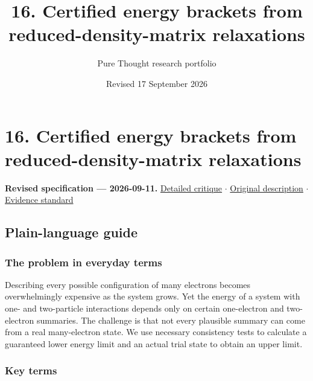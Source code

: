 \documentclass[
  11pt,
]{article}
\title{16. Certified energy brackets from reduced-density-matrix
relaxations}
\author{Pure Thought research portfolio}
\date{Revised 17 September 2026}
\begin{document}
\maketitle
\thispagestyle{empty}
\clearpage

\section{16. Certified energy brackets from reduced-density-matrix
relaxations}

\textbf{Revised specification --- 2026-09-11.}
\href{https://github.com/rick-stevens-ai/Pure-Thought/blob/main/reviews/16-N-Representability-2RDM.md}{Detailed
critique} \ensuremath{\cdot}
\href{https://github.com/rick-stevens-ai/Pure-Thought/blob/main/archive/original-PRDs/16-N-Representability-2RDM.md}{Original
description} \ensuremath{\cdot}
\href{https://github.com/rick-stevens-ai/Pure-Thought/blob/main/reviews/EVIDENCE-STANDARD.md}{Evidence
standard}

\subsection{Plain-language guide}

\subsubsection{The problem in everyday terms}

Describing every possible configuration of many electrons becomes
overwhelmingly expensive as the system grows. Yet the energy of a system
with one- and two-particle interactions depends only on certain
one-electron and two-electron summaries. The challenge is that not every
plausible summary can come from a real many-electron state. We use
necessary consistency tests to calculate a guaranteed lower energy limit
and an actual trial state to obtain an upper limit.

\subsubsection{Key terms}
\end{document}
